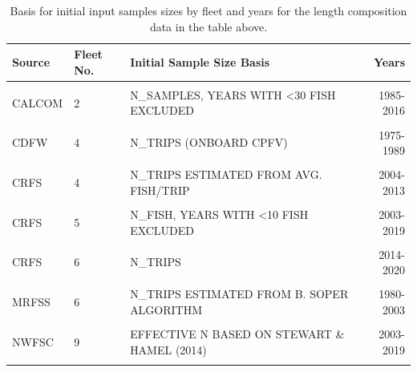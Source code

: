 \documentclass[
  english,
  a4paper,
]{article}
\begin{document}
\begin{table}

\caption{\label{tab:length-inputN}Basis for initial input samples sizes by fleet and years for the length composition data in the table above.}
\centering
\fontsize{10}{12}\selectfont
\begin{tabular}[t]{lllr}
\toprule
Source & Fleet No. & Initial Sample Size Basis & Years\\
\midrule
\cellcolor{gray!6}{CALCOM} & \cellcolor{gray!6}{1} & \cellcolor{gray!6}{N\_SAMPLES, YEARS WITH <30 FISH EXCLUDED} & \cellcolor{gray!6}{1983-2020}\\
CALCOM & 2 & N\_SAMPLES, YEARS WITH <30 FISH EXCLUDED & 1985-2016\\
\cellcolor{gray!6}{CALCOM} & \cellcolor{gray!6}{3} & \cellcolor{gray!6}{N\_SAMPLES, YEARS WITH <30 FISH EXCLUDED} & \cellcolor{gray!6}{1983-1998}\\
CDFW & 4 & N\_TRIPS (ONBOARD CPFV) & 1975-1989\\
\cellcolor{gray!6}{CRFS} & \cellcolor{gray!6}{4} & \cellcolor{gray!6}{N\_TRIPS} & \cellcolor{gray!6}{2014-2020}\\
CRFS & 4 & N\_TRIPS ESTIMATED FROM AVG. FISH/TRIP & 2004-2013\\
\cellcolor{gray!6}{MRFSS} & \cellcolor{gray!6}{4} & \cellcolor{gray!6}{N\_TRIPS ESTIMATED FROM B. SOPER ALGORITHM} & \cellcolor{gray!6}{1980-2003}\\
CRFS & 5 & N\_FISH, YEARS WITH <10 FISH EXCLUDED & 2003-2019\\
\cellcolor{gray!6}{CDFW} & \cellcolor{gray!6}{6} & \cellcolor{gray!6}{N\_FISH / 10} & \cellcolor{gray!6}{1978-1978}\\
CRFS & 6 & N\_TRIPS & 2014-2020\\
\cellcolor{gray!6}{CRFS} & \cellcolor{gray!6}{6} & \cellcolor{gray!6}{N\_TRIPS ESTIMATED FROM AVG. FISH/TRIP} & \cellcolor{gray!6}{2004-2013}\\
MRFSS & 6 & N\_TRIPS ESTIMATED FROM B. SOPER ALGORITHM & 1980-2003\\
\cellcolor{gray!6}{NWFSC} & \cellcolor{gray!6}{8} & \cellcolor{gray!6}{N\_SAMPLES (NUMBER OF POSITIVE DROPS)} & \cellcolor{gray!6}{2004-2019}\\
NWFSC & 9 & EFFECTIVE N  BASED ON STEWART \& HAMEL (2014) & 2003-2019\\
\cellcolor{gray!6}{CDFW} & \cellcolor{gray!6}{11} & \cellcolor{gray!6}{N\_FISH / 10} & \cellcolor{gray!6}{1975-1979}\\
\bottomrule
\end{tabular}
\end{table}
\end{document}
